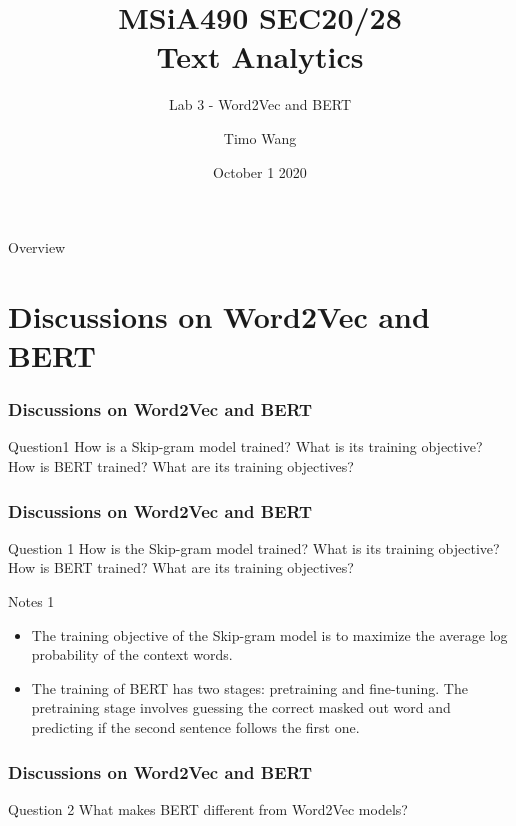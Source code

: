 \documentclass{beamer}
\begin{document}
\title{MSiA490 SEC20/28\\ Text Analytics}
\subtitle{Lab 3 - Word2Vec and BERT}
\author{Timo Wang}
\date{October 1 2020}

\begin{frame}
    \titlepage
\end{frame}

\begin{frame}{Overview}
    \tableofcontents[hideallsubsections]
\end{frame}

\section{Discussions on Word2Vec and BERT}
\begin{frame}
    \frametitle{Discussions on Word2Vec and BERT}
    \begin{block}{Question1 }
        How is a Skip-gram model trained? What is its training objective? 
    How is BERT trained? What are its training objectives?
    \end{block}
\end{frame}

\begin{frame}
    \frametitle{Discussions on Word2Vec and BERT}
    \begin{block}{Question 1}
        How is the Skip-gram model trained? What is its training objective? 
    How is BERT trained? What are its training objectives?
    \end{block}
    \begin{block}{Notes 1}
        \begin{itemize}
            \item The training objective of the Skip-gram model is to maximize the average log probability of the context words.
            \item The training of BERT has two stages: pretraining and fine-tuning. The pretraining stage involves guessing the correct masked out word and predicting if the second sentence follows the first one.
        \end{itemize}
    \end{block}
\end{frame}

\begin{frame}
    \frametitle{Discussions on Word2Vec and BERT}
    \begin{block}{Question 2}
        What makes BERT different from Word2Vec models?
    \end{block}
\end{frame}
\end{document}
